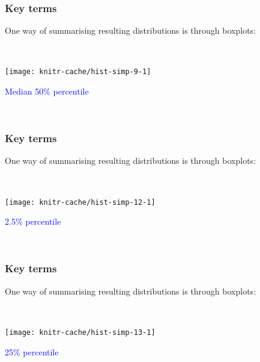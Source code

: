 
\begin{frame}
\frametitle{Key terms}

One way of summarising resulting distributions is through boxplots:

~\\

\begin{knitrout}
\color{fgcolor}
\texttt{[image: knitr-cache/hist-simp-9-1]}

\end{knitrout}
\textcolor{blue}{Median 50\% percentile}  %

~\\

\end{frame}



\begin{frame}
\frametitle{Key terms}

One way of summarising resulting distributions is through boxplots:

~\\

\begin{knitrout}
\color{fgcolor}
\texttt{[image: knitr-cache/hist-simp-12-1]}

\end{knitrout}
\textcolor{blue}{2.5\% percentile}  %

~\\

\end{frame}


\begin{frame}
\frametitle{Key terms}

One way of summarising resulting distributions is through boxplots:

~\\

\begin{knitrout}
\color{fgcolor}
\texttt{[image: knitr-cache/hist-simp-13-1]}

\end{knitrout}
\textcolor{blue}{25\% percentile}  %

~\\

\end{frame}

